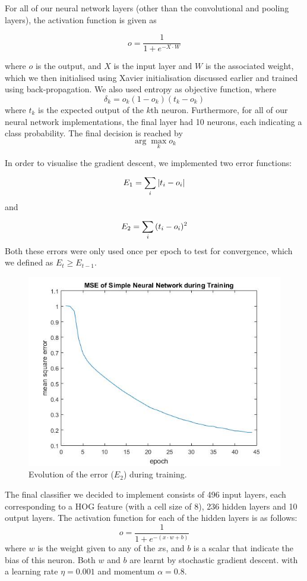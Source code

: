 \documentclass{article} %
\begin{document}
For all of our neural network layers (other than the convolutional and pooling layers), the activation function is given as

$$o = \frac{1}{1+e^{-X\cdot W}}$$

where $o$ is the output, and $X$ is the input layer and $W$ is the associated weight, which we then initialised using Xavier initialisation discussed earlier and trained using back-propagation.
We also used entropy as objective function, where
$$\delta_k = o_k(1-o_k)(t_k-o_k)$$
where $t_k$ is the expected output of the $k$th neuron. Furthermore, for all of our neural network implementations, the final layer had 10 neurons, each indicating a class probability. The final decision is reached by 
$$\arg\max_k o_k$$

In order to visualise the gradient descent, we implemented two error functions:
  $$E_1 = \sum^{}_{i}{|t_i-o_i|}$$
and
  $$E_2 = \sum^{}_{i}{(t_i-o_i)^2}$$
Both these errors were only used once per epoch to test for convergence, which we defined as $E_{t}\geq E_{t-1}$.

\begin{figure}
\centering
\includegraphics[scale=0.55]{MSENN.jpg}
\caption{Evolution of the error ($E_2$) during training. }
\end{figure}


The final classifier we decided to implement consists of 496 input layers, each corresponding to a HOG feature (with a cell size of 8), 236 hidden layers and 10 output layers. The activation function for each of the hidden layers is as follows:
  $$o = \frac{1}{1+e^{-(x\cdot w+b)}}$$
where $w$ is the weight given to any of the $x$s, and $b$ is a scalar that indicate the bias of this neuron. Both $w$ and $b$ are learnt by stochastic gradient descent. with a learning rate $\eta=0.001$ and momentum $\alpha=0.8$.
\end{document}
